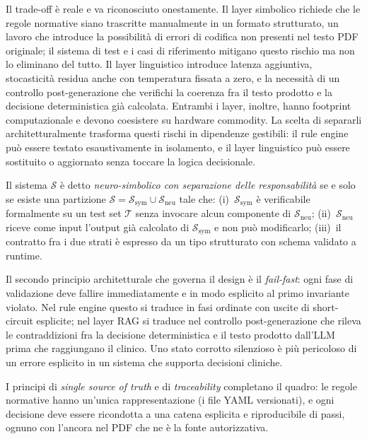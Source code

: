 Il trade-off è reale e va riconosciuto onestamente.
Il layer simbolico richiede che le regole normative siano trascritte
manualmente in un formato strutturato, un lavoro che introduce la possibilità
di errori di codifica non presenti nel testo PDF originale;
il sistema di test e i casi di riferimento mitigano questo rischio
ma non lo eliminano del tutto.
Il layer linguistico introduce latenza aggiuntiva, stocasticità residua
anche con temperatura fissata a zero, e la necessità di un controllo
post-generazione che verifichi la coerenza fra il testo prodotto e la
decisione deterministica già calcolata.
Entrambi i layer, inoltre, hanno footprint computazionale e devono
coesistere su hardware commodity.
La scelta di separarli architetturalmente trasforma questi rischi in
dipendenze gestibili: il rule engine può essere testato esaustivamente
in isolamento, e il layer linguistico può essere sostituito o aggiornato
senza toccare la logica decisionale.

\begin{definition}
\label{def:separazione}
Il sistema $\mathcal{S}$ è detto \emph{neuro-simbolico con separazione
delle responsabilità} se e solo se esiste una partizione
$\mathcal{S} = \mathcal{S}_{\text{sym}} \cup \mathcal{S}_{\text{neu}}$
tale che: (i)~$\mathcal{S}_{\text{sym}}$ è verificabile formalmente
su un test set $\mathcal{T}$ senza invocare alcun componente di
$\mathcal{S}_{\text{neu}}$; (ii)~$\mathcal{S}_{\text{neu}}$ riceve
come input l'output già calcolato di $\mathcal{S}_{\text{sym}}$
e non può modificarlo; (iii)~il contratto fra i due strati è espresso
da un tipo strutturato con schema validato a runtime.
\end{definition}

Il secondo principio architetturale che governa il design è il
\emph{fail-fast}: ogni fase di validazione deve fallire immediatamente
e in modo esplicito al primo invariante violato.
Nel rule engine questo si traduce in fasi ordinate con uscite di
short-circuit esplicite; nel layer RAG si traduce nel controllo
post-generazione che rileva le contraddizioni fra la decisione
deterministica e il testo prodotto dall'LLM prima che raggiungano
il clinico.
Uno stato corrotto silenzioso è più pericoloso di un errore esplicito
in un sistema che supporta decisioni cliniche.

I principi di \emph{single source of truth} e di \emph{traceability}
completano il quadro: le regole normative hanno un'unica rappresentazione
(i file YAML versionati), e ogni decisione deve essere ricondotta a una
catena esplicita e riproducibile di passi, ognuno con l'ancora nel PDF
che ne è la fonte autorizzativa.

